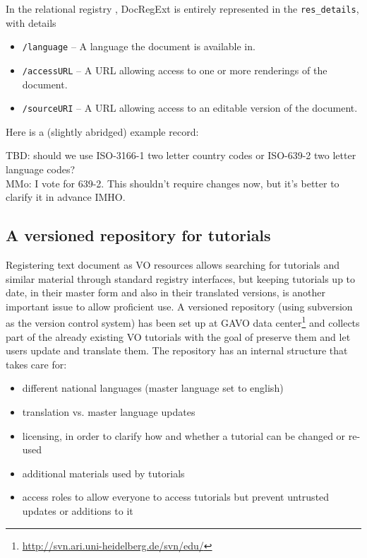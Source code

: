 \documentclass{ivoa}
\begin{document}

In the relational registry \citep{2014ivoa.spec.1208D}, DocRegExt is
entirely represented in the \verb|res_details|, with details


\begin{itemize}

\item \texttt{/language} -- A language the document is available in.{}

\item \texttt{/accessURL} -- A URL allowing access to one or more
renderings of the document.{}

\item \texttt{/sourceURI} -- A URL allowing access to an editable version of the document.{}

\end{itemize}
Here is a (slightly abridged) example record:

TBD: should we use ISO-3166-1 two letter 
country codes or ISO-639-2 two letter language codes?\\
MMo: I vote for 639-2. This shouldn't require changes now, 
but it's better to clarify it in advance IMHO.


\subsection{A versioned repository for tutorials}

\label{sect:svn-repo}

Registering text document as VO resources allows searching for tutorials
and similar 
material through standard registry interfaces, but keeping 
tutorials up to date, in their master form and also in their translated 
versions, is another important issue to allow proficient use.
A versioned repository (using subversion as the version control system) 
has been set up at GAVO data
center\footnote{\url{http://svn.ari.uni-heidelberg.de/svn/edu/}} 
and collects part of the
already existing VO tutorials with the goal of preserve them and let users 
update and translate them.
The repository has an internal structure that takes care for:

\begin{itemize}

\item different national languages (master language set to english){}

\item translation vs. master language updates{}

\item licensing, in order to clarify how and whether a tutorial can be changed or re-used{}

\item additional materials used by tutorials{}

\item access roles to allow everyone to access tutorials but prevent untrusted updates or additions to it{}

\end{itemize}
\end{document}
